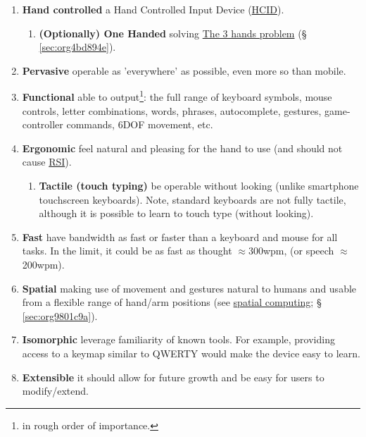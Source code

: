 \documentclass[logo,bsc,singlespacing,parskip]{infthesis}
\begin{document}
\begin{enumerate}
\item \textbf{Hand controlled} a Hand Controlled Input Device (\hyperref[org0c83164]{HCID}).

\begin{enumerate}
\item \textbf{(Optionally) One Handed} solving \hyperref[sec:org4bd894e]{The 3 hands problem} (§ \ref{sec:org4bd894e}).
\end{enumerate}

\item \textbf{Pervasive} operable as 'everywhere' as possible, even more so than mobile.

\item \textbf{Functional} able to output\footnote{in rough order of importance.}: the full range of keyboard symbols, mouse controls, letter combinations, words, phrases, autocomplete, gestures, game-controller commands, 6DOF movement, etc.

\item \textbf{Ergonomic} feel natural and pleasing for the hand to use (and should not cause \hyperref[org77f0234]{RSI}).

\begin{enumerate}
\item \textbf{Tactile (touch typing)} be operable without looking (unlike smartphone touchscreen keyboards). Note, standard keyboards are not fully tactile, although it is possible to learn to touch type (without looking).
\end{enumerate}

\item \textbf{Fast} have bandwidth as fast or faster than a keyboard and mouse for all tasks. In the limit, it could be as fast as thought \(\approx\)300wpm, (or speech \(\approx\)200wpm).

\item \textbf{Spatial} making use of movement and gestures natural to humans and usable from a flexible range of hand/arm positions (see \hyperref[sec:org9801c9a]{spatial computing}; § \ref{sec:org9801c9a}).

\item \textbf{Isomorphic} leverage familiarity of known tools. For example, providing access to a keymap similar to QWERTY would make the device easy to learn.

\item \textbf{Extensible} it should allow for future growth and be easy for users to modify/extend.
\end{enumerate}
\end{document}
